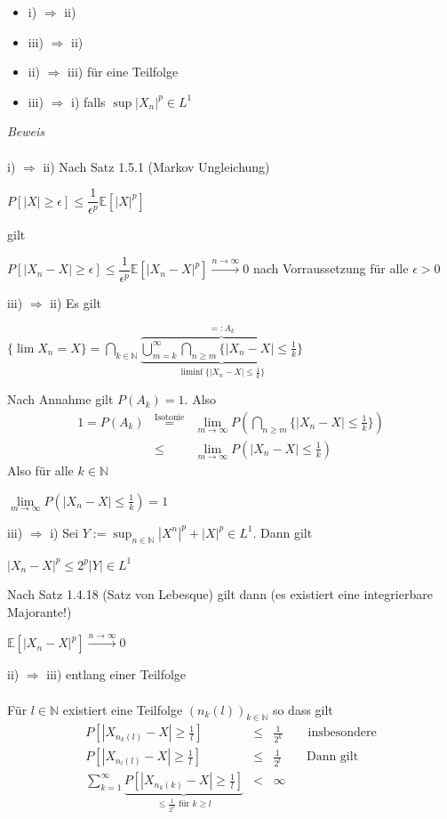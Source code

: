 \documentclass[10pt,a4paper]{report}
\newcommand{\E}{\mathbb{E}}
\newcommand{\N}{\mathbb{N}}
\numberwithin{equation}{section}
\numberwithin{figure}{section}
\theoremstyle{plain}
\theoremstyle{definition}
\theoremstyle{plain}
\theoremstyle{definition}
\theoremstyle{remark}
\theoremstyle{plain}
\theoremstyle{plain}
\theoremstyle{plain}
\newcommand{\1}{ \mathbb{1} } %
\begin{document}
\begin{itemize}
\item i) $\Rightarrow$ ii)
\item iii) $\Rightarrow$ ii)
\item ii) $\Rightarrow$ iii) für eine Teilfolge
\item iii) $\Rightarrow$ i) falls $\sup|X_n|^p \in L^1$
\end{itemize}
\textit{Beweis}\\\\
i) $\Rightarrow$ ii) Nach Satz 1.5.1 (Markov Ungleichung)
\begin{center}
$P[|X|\geq \epsilon] \leq \dfrac{1}{\epsilon^p}\E[|X|^p]$
\end{center}
gilt
\begin{center}
$P[|X_n-X|\geq \epsilon] \leq \dfrac{1}{\epsilon^p} \E[|X_n-X|^p] \overset{n \to \infty}{\to} 0$ nach Vorraussetzung für alle $\epsilon>0$
\end{center}
iii) $\Rightarrow$ ii) Es gilt 
\begin{center}
$\{\lim X_n=X\}=\bigcap\limits_{k \in \N}\underbrace{\overbrace{\bigcup\limits_{m=k}^\infty\bigcap\limits_{n\geq m} \{|X_n-X|\leq \frac{1}{k}\}}}^{=:A_k}_{\liminf \{|X_n-X|\leq \frac{1}{k}\}}$
\end{center}
Nach Annahme gilt $P(A_k)=1$. Also
\begin{eqnarray*}
1=P(A_k)&\overset{\text{Isotonie}}{=}& \lim\limits_{m \to \infty} P(\bigcap\limits_{n\geq m}\{|X_n-X|\leq \frac{1}{k}\})\\
&\leq& \lim\limits_{m \to \infty} P(|X_n-X|\leq \frac{1}{k})
\end{eqnarray*}
Also für alle $k \in \N$
\begin{center}
$\lim\limits_{m \to \infty} P(|X_n-X|\leq\frac{1}{k})=1$
\end{center}
iii) $\Rightarrow$ i) Sei $Y:=\sup_{n \in \N}|X^n|^p+|X|^p \in L^1$. Dann gilt
\begin{center}
$|X_n-X|^p\leq 2^p|Y| \in L^1$
\end{center}
Nach Satz 1.4.18 (Satz von Lebesque) gilt dann (es existiert eine integrierbare Majorante!)
\begin{center}
$\E[|X_n-X|^p]\overset{n \to \infty}{\to} 0$
\end{center}
ii) $\Rightarrow$ iii) entlang einer Teilfolge\\\\
Für $l \in \N$ existiert eine Teilfolge $(n_k(l))_{k \in \N}$ so dass gilt
\begin{eqnarray*}
P[|X_{n_k(l)}-X|\geq \frac{1}{l}] &\leq& \frac{1}{2^k} \qquad \text{insbesondere}\\
P[|X_{n_l(l)}-X|\geq \frac{1}{l}] &\leq& \frac{1}{2^l} \qquad \text{Dann gilt}\\
\sum\limits_{k=1}^\infty \underbrace{P[|X_{n_k(k)}-X|\geq \frac{1}{l}]}_{\leq \frac{1}{2^k} \text{ für } k \geq l} &<& \infty
\end{eqnarray*}
\end{document}
